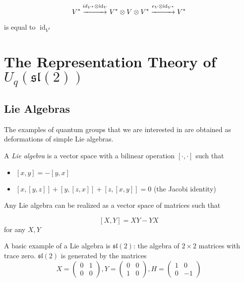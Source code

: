 \documentclass[]{article}
\newcommand{\id}{\operatorname{id}}
\begin{document}
\begin{equation}
    V^* \stackrel{id_{V^*} \otimes \id_V}{\xrightarrow{\hspace*{1cm}}} V^*
    \otimes V \otimes V^*  \stackrel{e_V \otimes
    \id_{V^*}}{\xrightarrow{\hspace*{1cm}}} V^*
\end{equation}

is equal to $\id_{V^*}$
\section{The Representation Theory of $U_q(\mathfrak{sl}(2))$}
\subsection{Lie Algebras}

The examples of quantum groups that we are interested in are obtained as deformations of simple Lie algebras. 

A \emph{Lie algebra} is a vector space with a bilinear operation $\left[ \cdot, \cdot \right]$ such that 

\begin{itemize}
    \item $\left[ x,y \right] = -\left[ y,x \right]$
    \item $\left[ x, \left[ y,z \right] \right] + \left[ y, \left[ z,x \right] \right] + \left[ z, \left[ x,y \right] \right] = 0$ (the Jacobi identity)
\end{itemize}

Any Lie algebra can be realized as a vector space of matrices such that 

\[ \left[ X,Y \right] = XY - YX\] 
for any $X,Y$

A basic example of a Lie algebra is $\mathfrak{sl}(2)$: the algebra of $2 \times 2$ matrices with trace zero. $\mathfrak{sl}(2)$ is generated by the matrices 
\begin{equation}
    X = \begin{pmatrix} 0 & 1 \\ 0 & 0 \end{pmatrix},
    Y = \begin{pmatrix} 0 & 0 \\ 1 & 0 \end{pmatrix}, 
    H = \begin{pmatrix} 1 & 0 \\ 0 &-1 \end{pmatrix}
\end{equation}
\end{document}
